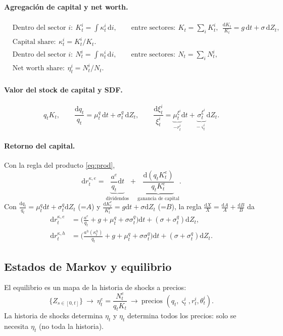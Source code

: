 \documentclass[11pt]{article}
\theoremstyle{definition}
\theoremstyle{remark}
\newcommand{\dd}{\mathrm{d}}
\newcommand{\aE}{a^{e}}
\newcommand{\aH}{a^{h}}
\newcommand{\vsig}{\varsigma}
\newcommand{\sq}{\sigma_t^{q}}
\begin{document}
\paragraph{Agregación de capital y net worth.}
\begin{align*}
&\text{Dentro del sector } i:\ K_t^{i}=\int\kappa_t^{i}\,\dd i,\qquad
\text{entre sectores}:\ K_t=\textstyle\sum_i K_t^{i},\ \ \frac{\dd K_t}{K_t}=g\,\dd t+\sigma\,\dd Z_t,\\
&\text{Capital share}:\ \kappa_t^{i}=K_t^{i}/K_t.\\[4pt]
&\text{Dentro del sector } i:\ N_t^{i}=\int n_t^{i}\,\dd i,\qquad
\text{entre sectores}:\ N_t=\textstyle\sum_i N_t^{i},\\
&\text{Net worth share}:\ \eta_t^{i}=N_t^{i}/N_t.
\end{align*}

\paragraph{Valor del stock de capital y SDF.}
\[
q_tK_t,\qquad \frac{\dd q_t}{q_t}=\mu_t^{q}\,\dd t+\sq\,\dd Z_t,
\qquad
\frac{\dd\xi_t^{i}}{\xi_t^{i}}=\underbrace{\mu_t^{\xi^{i}}}_{-r_t^{i}}\dd t+\underbrace{\sigma_t^{\xi^{i}}}_{-\vsig_t^{i}}\dd Z_t.
\]

\paragraph{Retorno del capital.} Con la regla del producto \eqref{eq:prod},
\[
\dd r_t^{\kappa,e}=\underbrace{\frac{\aE}{q_t}\dd t}_{\text{dividendos}}+\underbrace{\frac{\dd(q_tK_t^{e})}{q_tK_t^{e}}}_{\text{ganancia de capital}}.
\]
Con $\tfrac{\dd q_t}{q_t}=\mu_t^{q}\dd t+\sq\dd Z_t$ (=$A$) y $\tfrac{\dd K_t^{e}}{K_t^{e}}=g\dd t+\sigma\dd Z_t$ (=$B$), la regla $\tfrac{\dd X}{X}=\tfrac{\dd A}{A}+\tfrac{\dd B}{B}$ da
\begin{align}
\dd r_t^{\kappa,e}&=\Big(\frac{\aE}{q_t}+g+\mu_t^{q}+\sigma\sq\Big)\dd t+(\sigma+\sq)\dd Z_t,\\
\dd r_t^{\kappa,h}&=\Big(\frac{\aH(\kappa_t^{h})}{q_t}+g+\mu_t^{q}+\sigma\sq\Big)\dd t+(\sigma+\sq)\dd Z_t.
\end{align}

\subsection{Estados de Markov y equilibrio}

El equilibrio es un mapa de la historia de shocks a precios:
\[
\{Z_{s\in[0,t]}\}\ \longrightarrow\ \eta_t^{e}=\frac{N_t^{e}}{q_tK_t}\ \longrightarrow\ \text{precios }(q_t,\vsig_t^{i},r_t^{i},\theta_t^{i}).
\]
La historia de shocks determina $\eta_t$ y $\eta_t$ determina todos los precios: solo se necesita $\eta_t$ (no toda la historia).
\end{document}
